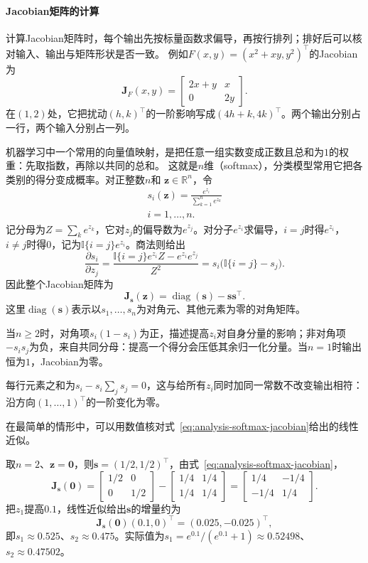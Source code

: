 \paragraph{Jacobian矩阵的计算}
计算Jacobian矩阵时，每个输出先按标量函数求偏导，再按行排列；排好后可以核对输入、输出与矩阵形状是否一致。
例如$F(x,y)=(x^2+xy,y^2)^\top$的Jacobian为
\[
 \bm J_F(x,y)=\begin{bmatrix}2x+y&x\\0&2y\end{bmatrix}.
\]
在$(1,2)$处，它把扰动$(h,k)^\top$的一阶影响写成$(4h+k,4k)^\top$。两个输出分别占一行，两个输入分别占一列。

机器学习中一个常用的向量值映射，是把任意一组实数变成正数且总和为$1$的权重：先取指数，再除以共同的总和。
这就是$n$维（softmax），分类模型常用它把各类别的得分变成概率。对正整数$n$和
$\bm{z}\in\mathbb{R}^n$，令
\[
 \begin{gathered}
s_i(\bm{z})
  =
  \frac{e^{z_i}}{\sum_{k=1}^n e^{z_k}}\\
i=1,\ldots,n.
 \end{gathered}
\]
记分母为$Z=\sum_k e^{z_k}$，它对$z_j$的偏导数为$e^{z_j}$。对分子$e^{z_i}$求偏导，$i=j$时得$e^{z_i}$，$i\neq j$时得$0$，记为$\mathbb{I}\{i=j\}e^{z_i}$。商法则给出
\[
  \frac{\partial s_i}{\partial z_j}
  =
  \frac{\mathbb{I}\{i=j\}e^{z_i}Z-e^{z_i}e^{z_j}}{Z^2}
  =
  s_i\bigl(\mathbb{I}\{i=j\}-s_j\bigr).
\]
因此整个Jacobian矩阵为
\begin{equation}
  \bm{J}_{\bm{s}}(\bm{z})
  =
  \operatorname{diag}(\bm{s})-\bm{s}\bm{s}^{\top}.
\label{eq:analysis-softmax-jacobian}
\end{equation}
这里$\operatorname{diag}(\bm s)$表示以$s_1,\ldots,s_n$为对角元、其他元素为零的对角矩阵。

当$n\geq2$时，对角项$s_i(1-s_i)$为正，描述提高$z_i$对自身分量的影响；非对角项$-s_is_j$为负，来自共同分母：提高一个得分会压低其余归一化分量。当$n=1$时输出恒为$1$，Jacobian为零。

每行元素之和为$s_i-s_i\sum_js_j=0$，这与给所有$z_i$同时加同一常数不改变输出相符：沿方向$(1,\ldots,1)^\top$的一阶变化为零。

在最简单的情形中，可以用数值核对式~\eqref{eq:analysis-softmax-jacobian}给出的线性近似。
\begin{example}[二维softmax的Jacobian矩阵]
\label{ex:multivariable-softmax-jacobian-check}
取$n=2$、$\bm z=\bm 0$，则$\bm s=(1/2,1/2)^\top$，由式~\eqref{eq:analysis-softmax-jacobian}，
\[
 \bm J_{\bm s}(\bm 0)
 =\begin{bmatrix}1/2&0\\0&1/2\end{bmatrix}-\begin{bmatrix}1/4&1/4\\1/4&1/4\end{bmatrix}
 =\begin{bmatrix}1/4&-1/4\\-1/4&1/4\end{bmatrix}.
\]
把$z_1$提高$0.1$，线性近似给出$\bm s$的增量约为
\[
 \bm J_{\bm s}(\bm 0)(0.1,0)^\top=(0.025,-0.025)^\top,
\]
即$s_1\approx0.525$、$s_2\approx0.475$。实际值为$s_1=e^{0.1}/(e^{0.1}+1)\approx0.52498$、$s_2\approx0.47502$。
\end{example}

